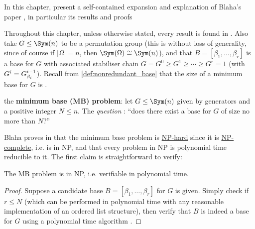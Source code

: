 In this chapter,  present a self-contained expansion and explanation of Blaha's paper \cite{blaha1992}, in particular its results and proofs

Throughout this chapter, unless otherwise stated, every result is found in \cite{blaha1992}. Also take $G \leq \Sym(n)$ to be a permutation group (this is without loss of generality, since of course if $|\Omega| = n$, then $\Sym(\Omega) \cong \Sym(n)$), and that $B = [\beta_1,\dotsc,\beta_r]$ is a base for $G$ with associated stabiliser chain $G = G^0 \geq G^1 \geq \dotsb \geq G^r = 1$ (with $G^i = \added{2}{G^{i-1}_{\beta_i}}$). Recall from \autoref{def:nonredundant_base} that the size of a minimum base for $G$ is . %

 the \textbf{minimum base (MB) problem}: let $G \leq \Sym(n)$ given by generators and a positive integer $N \leq n$. The \textit{question} : ``does there exist a base for $G$ of size no more than $N$?''

Blaha proves in \cite{blaha1992} that the minimum base problem is \hyperref[def:NP_hard]{NP-hard} since it is \hyperref[def:NP_complete]{NP-complete}, i.e.  is in NP, and that every problem in NP is polynomial time reducible to it. The first claim is straightforward to verify:

\begin{lemma}
    The MB problem is in NP, i.e. verifiable in polynomial time.
\end{lemma}

\begin{proof}
    Suppose a candidate base $B = [\beta_1,\dotsc,\beta_r]$ for $G$ is given. Simply check if $r \leq N$ (which can be performed in polynomial time with any reasonable implementation of an ordered list structure), then verify that $B$ is indeed a base for $G$ using a polynomial time algorithm .
\end{proof}

